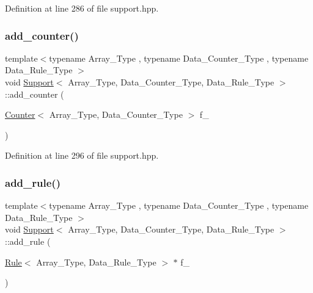 Definition at line 286 of file support.\+hpp.

\mbox{\label{class_support_a00d511970c0bf833ef8bdd7580c670cc}} 
\subsubsection{\texorpdfstring{add\+\_\+counter()}{add\_counter()}\hspace{0.1cm}{\footnotesize\ttfamily [2/2]}}
{\footnotesize\ttfamily template$<$typename Array\+\_\+\+Type , typename Data\+\_\+\+Counter\+\_\+\+Type , typename Data\+\_\+\+Rule\+\_\+\+Type $>$ \\
void \hyperlink{class_support}{Support}$<$ Array\+\_\+\+Type, Data\+\_\+\+Counter\+\_\+\+Type, Data\+\_\+\+Rule\+\_\+\+Type $>$\+::add\+\_\+counter (\begin{DoxyParamCaption}\item[{\hyperlink{class_counter}{Counter}$<$ Array\+\_\+\+Type, Data\+\_\+\+Counter\+\_\+\+Type $>$}]{f\+\_\+ }\end{DoxyParamCaption})\hspace{0.3cm}{\ttfamily [inline]}}



Definition at line 296 of file support.\+hpp.

\mbox{\label{class_support_a3113a4586c541aa25db7b4a864b748a2}} 
\subsubsection{\texorpdfstring{add\+\_\+rule()}{add\_rule()}\hspace{0.1cm}{\footnotesize\ttfamily [1/2]}}
{\footnotesize\ttfamily template$<$typename Array\+\_\+\+Type , typename Data\+\_\+\+Counter\+\_\+\+Type , typename Data\+\_\+\+Rule\+\_\+\+Type $>$ \\
void \hyperlink{class_support}{Support}$<$ Array\+\_\+\+Type, Data\+\_\+\+Counter\+\_\+\+Type, Data\+\_\+\+Rule\+\_\+\+Type $>$\+::add\+\_\+rule (\begin{DoxyParamCaption}\item[{\hyperlink{class_rule}{Rule}$<$ Array\+\_\+\+Type, Data\+\_\+\+Rule\+\_\+\+Type $>$ $\ast$}]{f\+\_\+ }\end{DoxyParamCaption})\hspace{0.3cm}{\ttfamily [inline]}}



